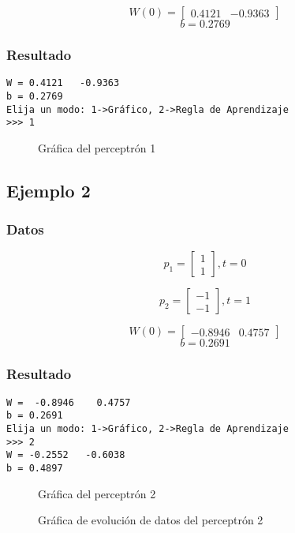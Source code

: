 \documentclass{article}
\begin{document}
\[W(0)= 
\begin{bmatrix}
 0.4121  & -0.9363
\end{bmatrix}
\]
$$ b= 0.2769 $$
\subsubsection{Resultado}
\begin{lstlisting}
W = 0.4121   -0.9363
b = 0.2769
Elija un modo: 1->Gráfico, 2->Regla de Aprendizaje
>>> 1
\end{lstlisting}
\begin{figure}[htpb]
	\centering
	
	\caption{Gráfica del perceptrón 1}
\end{figure}
\newpage
\subsection{Ejemplo 2}
\subsubsection{Datos}
\[p_1=
\begin{bmatrix}
1\\
1
\end{bmatrix}
, t=0
\]

\[p_2=
\begin{bmatrix}
-1\\
-1
\end{bmatrix}
, t=1
\]

\[W(0)= 
\begin{bmatrix}
  -0.8946 &   0.4757
\end{bmatrix}
\]
$$ b= 0.2691 $$
\subsubsection{Resultado}
\begin{lstlisting}
W =  -0.8946    0.4757
b = 0.2691
Elija un modo: 1->Gráfico, 2->Regla de Aprendizaje
>>> 2
W = -0.2552   -0.6038
b = 0.4897
\end{lstlisting}
\begin{figure}[htpb]
	\centering
	
	\caption{Gráfica del perceptrón 2}
\end{figure}
\begin{figure}[htpb]
	\centering
	
	\caption{Gráfica de evolución de datos del perceptrón 2}
\end{figure}
\newpage
\end{document}
